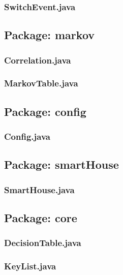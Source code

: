 \subsubsection{SwitchEvent.java}


\subsection{Package: markov}
\subsubsection{Correlation.java}

\subsubsection{MarkovTable.java}


\subsection{Package: config}
\subsubsection{Config.java}


\subsection{Package: smartHouse}
\subsubsection{SmartHouse.java}


\subsection{Package: core}
\subsubsection{DecisionTable.java}

\subsubsection{KeyList.java}


